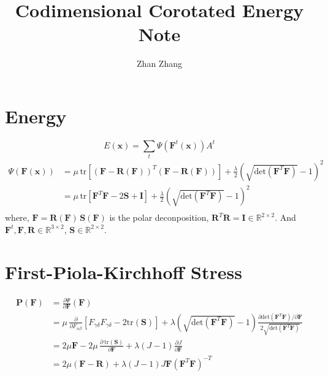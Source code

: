 \documentclass{article}
\begin{document}
\newcommand{\bC}{\mathbf{C}}
\newcommand{\bF}{\mathbf{F}}
\newcommand{\bI}{\mathbf{I}}
\newcommand{\bP}{\mathbf{P}}
\newcommand{\bR}{\mathbf{R}}
\newcommand{\R}{\mathbb{R}}
\newcommand{\bS}{\mathbf{S}}
\newcommand{\bX}{\mathbf{X}}
\newcommand{\bx}{\mathbf{x}}

\newcommand{\bFt}{\mathbf{F}^t}

\title{Codimensional Corotated Energy Note}
\author{Zhan Zhang}
\maketitle
\thispagestyle{empty}

\section{Energy}
    \begin{equation}
        E(\bx) = \sum_t\Psi(\bFt(\bx))A^t
    \end{equation}
    \begin{equation}
    \begin{aligned}
        \Psi(\bF(\bx)) &= \mu\,\text{tr}\left[(\bF-\bR(\bF))^T(\bF-\bR(\bF))\right]+\frac{\lambda}{2}(\sqrt{\text{det}(\bF^T\bF)}-1)^2\\
        &=\mu\,\text{tr}\left[\bF^T\bF-2\bS+\bI\right]+\frac{\lambda}{2}(\sqrt{\text{det}(\bF^T\bF)}-1)^2\\
    \end{aligned}
    \end{equation} 
    where, $\bF = \bR(\bF)\,\bS(\bF)$ is the polar deconposition, $\bR^T\bR = \bI\in\R^{2\times2}$. And $\bFt,\bF,\bR\in\R^{3\times2}$, $\bS\in\R^{2\times2}$. 

\section{First-Piola-Kirchhoff Stress}
    \begin{equation}
    \begin{aligned}
        \bP(\bF) &= \frac{\partial\Psi}{\partial\bF}(\bF)\\
        &= \mu\,\frac{\partial}{\partial F_{\alpha\beta}}\left[F_{\gamma\delta}F_{\gamma\delta}-2\text{tr}(\bS)\right]+\lambda(\sqrt{\text{det}(\bF^T\bF)}-1)\frac{\partial \text{det}(\bF^T\bF) /\partial \bF}{2\sqrt{\text{det}(\bF^T\bF)}}\\
        &= 2\mu\bF - 2\mu\,\frac{\partial \, \text{tr}(\bS)}{\partial \bF}+\lambda(J-1)\frac{\partial J}{\partial \bF}\\
        &= 2\mu(\bF-\bR)+\lambda(J-1)J\bF(\bF^T\bF)^{-T}
    \end{aligned}
    \end{equation}
\end{document}
